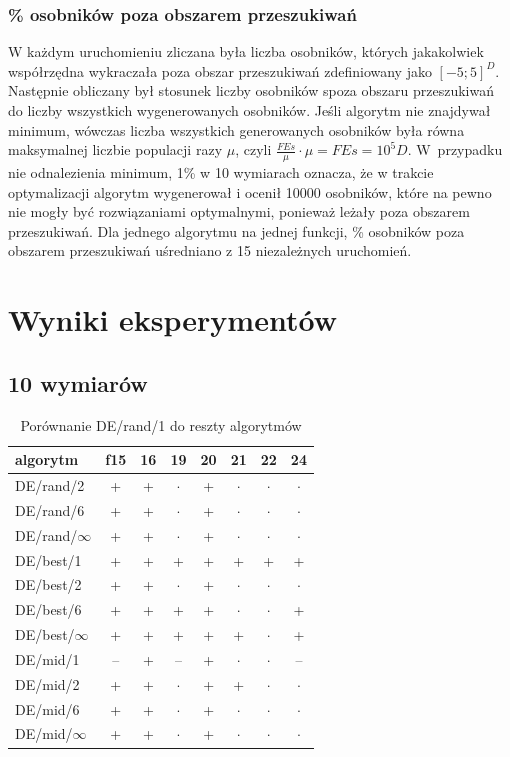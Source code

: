 \documentclass[a4paper,onecolumn,oneside,11pt,wide,floatssmall]{mwrep}
\theoremstyle{definition}
\theoremstyle{plain}%
\theoremstyle{remark}
\begin{document}
\subsection{\% osobników poza obszarem przeszukiwań}

W każdym uruchomieniu zliczana była liczba osobników, których jakakolwiek współrzędna wykraczała poza
obszar przeszukiwań zdefiniowany jako $[-5; 5]^D$. Następnie obliczany był stosunek liczby 
osobników spoza obszaru przeszukiwań do liczby wszystkich wygenerowanych osobników. Jeśli algorytm
nie znajdywał minimum, wówczas liczba wszystkich generowanych osobników była równa maksymalnej liczbie
populacji razy $\mu$, czyli $\frac{FEs}{\mu} \cdot \mu = FEs = 10^5D$. W~przypadku nie odnalezienia minimum, 
1\% w 10 wymiarach oznacza, że 
w trakcie optymalizacji algorytm wygenerował i ocenił 10000 osobników, 
które na pewno nie mogły być rozwiązaniami optymalnymi,
ponieważ leżały poza obszarem przeszukiwań. Dla jednego algorytmu na jednej funkcji, \% osobników
poza obszarem przeszukiwań uśredniano z 15 niezależnych uruchomień.

\chapter{Wyniki eksperymentów}

\section{10 wymiarów}

\begin{table}[H]
\centering
\begin{tabular}{ l | c | c | c | c | c | c | c }
algorytm         &f15& 16& 19& 20& 21& 22& 24 \\ \hline
DE/rand/2	 & + & + & $\cdot$ & + & $\cdot$ & $\cdot$ & $\cdot$ \\
DE/rand/6	 & + & + & $\cdot$ & + & $\cdot$ & $\cdot$ & $\cdot$ \\
DE/rand/$\infty$	 & + & + & $\cdot$ & + & $\cdot$ & $\cdot$ & $\cdot$ \\
DE/best/1	 & + & + & + & + & + & + & + \\
DE/best/2	 & + & + & $\cdot$ & + & $\cdot$ & $\cdot$ & $\cdot$ \\
DE/best/6	 & + & + & + & + & $\cdot$ & $\cdot$ & + \\
DE/best/$\infty$	 & + & + & + & + & + & $\cdot$ & + \\
DE/mid/1	 & -- & + & -- & + & $\cdot$ & $\cdot$ & -- \\
DE/mid/2	 & + & + & $\cdot$ & + & + & $\cdot$ & $\cdot$ \\
DE/mid/6	 & + & + & $\cdot$ & + & $\cdot$ & $\cdot$ & $\cdot$ \\
DE/mid/$\infty$	 & + & + & $\cdot$ & + & $\cdot$ & $\cdot$ & $\cdot$ \\
\end{tabular}
\caption{Porównanie DE/rand/1 do reszty algorytmów}
\end{table}
\end{document}
